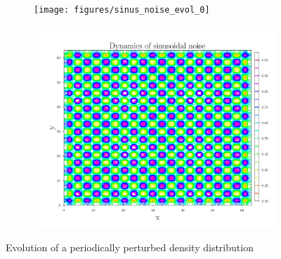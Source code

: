    \begin{figure}[H]
 \centering
 \begin{subfigure}{0.42\textwidth} 
 	\texttt{[image: figures/sinus\_noise\_evol\_0]}
 \end{subfigure}
 \begin{subfigure}{0.42\textwidth} 
 	\includegraphics[width= \textwidth]{figures/sinus_noise_evol_100}
 \end{subfigure}
 
 \caption{Evolution of a periodically perturbed density distribution}	
 \end{figure}